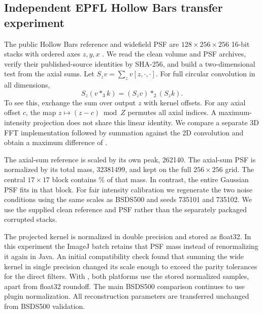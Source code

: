 \subsection{Independent EPFL Hollow Bars transfer experiment}

The public Hollow Bars reference and widefield PSF are \(128\times256\times256\) 16-bit stacks with ordered axes \(z,y,x\) \citep{epflbars}. We read the clean volume and PSF archives, verify their published-source identities by SHA-256, and build a two-dimensional test from the axial sums. Let \(S_z v=\sum_z v[z,\cdot,\cdot]\). For full circular convolution in all dimensions,
\begin{equation}
S_z(v *_3 k)=(S_z v)*_2(S_z k).
\label{eq:projection}
\end{equation}
To see this, exchange the sum over output \(z\) with kernel offsets. For any axial offset \(c\), the map \(z\mapsto (z-c)\bmod Z\) permutes all axial indices. A maximum-intensity projection does not share this linear identity. We compare a separate 3D FFT implementation followed by summation against the 2D convolution and obtain a maximum difference of \EpflProjectionError{}.

The axial-sum reference is scaled by its own peak, 262140. The axial-sum PSF is normalized by its total mass, 32381499, and kept on the full \(256\times256\) grid. The central \(17\times17\) block contains \EpflMassPercent\% of that mass. In contrast, the entire Gaussian PSF fits in that block. For fair intensity calibration we regenerate the two noise conditions using the same scales as BSDS500 and seeds 735101 and 735102. We use the supplied clean reference and PSF rather than the separately packaged corrupted stacks.

The projected kernel is normalized in double precision and stored as float32. In this experiment the ImageJ batch retains that PSF mass instead of renormalizing it again in Java. An initial compatibility check found that summing the wide kernel in single precision changed its scale enough to exceed the parity tolerances for the direct filters. With , both platforms use the stored normalized samples, apart from float32 roundoff. The main BSDS500 comparison continues to use plugin normalization. All reconstruction parameters are transferred unchanged from BSDS500 validation.
